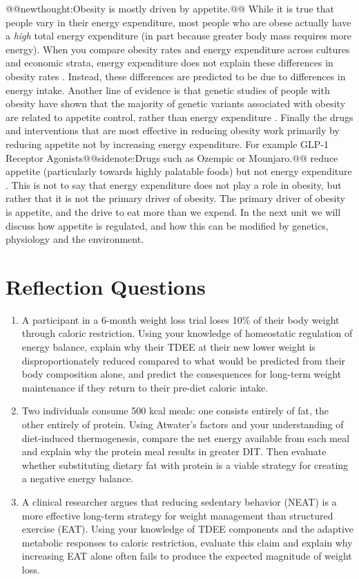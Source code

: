 \documentclass{tufte-handout}
\makeatletter
\def\newthought#1{@@newthought:#1@@}
\def\sidenote#1{@@sidenote:#1@@}
\makeatother
\begin{document}
\newthought{Obesity is mostly driven by appetite.}  While it is true that people vary in their energy expenditure, most people who are obese actually have a \emph{high} total energy expenditure (in part because greater body mass requires more energy).  When you compare obesity rates and energy expenditure across cultures and economic strata, energy expenditure does not explain these differences in obesity rates \citep{mcgroskyEnergyExpenditureObesity2025}.  Instead, these differences are predicted to be due to differences in energy intake. Another line of evidence is that genetic studies of people with obesity have shown that the majority of genetic variants associated with obesity are related to appetite control, rather than energy expenditure \citep{jefferyEvidenceImplicatingEating2007}.  Finally the drugs and interventions that are most effective in reducing obesity work primarily by reducing appetite not by increasing energy expenditure.  For example GLP-1 Receptor Agonists\sidenote{Drugs such as Ozempic or Mounjaro.} reduce appetite (particularly towards highly palatable foods) but not energy expenditure \citep{martinTirzepatideIngestiveBehavior2025}. This is not to say that energy expenditure does not play a role in obesity, but rather that it is not the primary driver of obesity.  The primary driver of obesity is appetite, and the drive to eat more than we expend.  In the next unit we will discuss how appetite is regulated, and how this can be modified by genetics, physiology and the environment.


\section{Reflection Questions}
\begin{enumerate}
\item A participant in a 6-month weight loss trial loses 10\% of their body weight through caloric restriction. Using your knowledge of homeostatic regulation of energy balance, explain why their TDEE at their new lower weight is disproportionately reduced compared to what would be predicted from their body composition alone, and predict the consequences for long-term weight maintenance if they return to their pre-diet caloric intake.
\item Two individuals consume 500 kcal meals: one consists entirely of fat, the other entirely of protein. Using Atwater's factors and your understanding of diet-induced thermogenesis, compare the net energy available from each meal and explain why the protein meal results in greater DIT. Then evaluate whether substituting dietary fat with protein is a viable strategy for creating a negative energy balance.
\item A clinical researcher argues that reducing sedentary behavior (NEAT) is a more effective long-term strategy for weight management than structured exercise (EAT). Using your knowledge of TDEE components and the adaptive metabolic responses to caloric restriction, evaluate this claim and explain why increasing EAT alone often fails to produce the expected magnitude of weight loss.
\end{enumerate}



\end{document}
